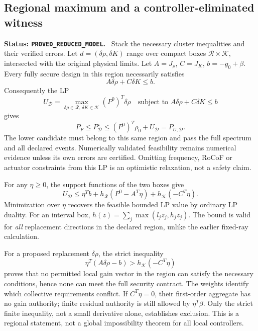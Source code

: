 \documentclass[11pt]{article}
\newcommand{\status}[1]{\par\smallskip\noindent\textbf{Status: \texttt{#1}.}\ }
\begin{document}
\subsection{Regional maximum and a controller-eliminated witness}
\status{PROVED\_REDUCED\_MODEL}
Stack the necessary cluster inequalities and their verified errors.
Let $d=(\delta\rho,\delta K)$ range over compact boxes
$\mathcal R\times\mathcal K$, intersected with the original physical
limits. Let $A=J_\rho$, $C=J_K$, $b=-g_0+\beta$.
Every fully secure design in this region necessarily satisfies
\[
 A\delta\rho+C\delta K\le b.
\]
Consequently the LP
\begin{equation}
 U_{\mathcal D}=\max_{\delta\rho\in\mathcal R,\,
                         \delta K\in\mathcal K}
 (P^0)^T\delta\rho\quad
 \text{subject to }A\delta\rho+C\delta K\le b \label{eq:regionalLP}
\end{equation}
gives
\begin{equation}
 \boxed{P_F\le P^\star_{\mathcal D}
 \le (P^0)^T\rho_0+U_{\mathcal D}=P_{U,\mathcal D}.}
 \label{eq:regional-bracket}
\end{equation}
The lower candidate must belong to this same region and pass the full
spectrum and all declared events. Numerically validated feasibility
remains numerical evidence unless its own errors are certified.
Omitting frequency, RoCoF or actuator constraints from this LP is an
optimistic relaxation, not a safety claim.

For any $\eta\ge0$, the support functions of the two boxes give
\begin{equation}
 U_{\mathcal D}\le
 \eta^Tb+h_{\mathcal R}(P^0-A^T\eta)
          +h_{\mathcal K}(-C^T\eta). \label{eq:regionaldual}
\end{equation}
Minimization over $\eta$ recovers the feasible bounded LP value
by ordinary LP duality. For an interval box,
$h(z)=\sum_j\max(l_jz_j,h_jz_j)$.
The bound is valid for \emph{all} replacement directions in the
declared region, unlike the earlier fixed-ray calculation.

For a proposed replacement $\delta\rho$, the strict inequality
\begin{equation}
 \eta^T(A\delta\rho-b)>h_{\mathcal K}(-C^T\eta)
 \label{eq:regional-exclusion}
\end{equation}
proves that no permitted local gain vector in the region can satisfy
the necessary conditions, hence none can meet the full security contract.
The weights identify which collective requirements conflict.
If $C^T\eta=0$, their first-order aggregate has no gain authority;
finite residual authority is still allowed by $\eta^T\beta$.
Only the strict finite inequality, not a small derivative alone,
establishes exclusion. This is a regional statement, not a global
impossibility theorem for all local controllers.
\end{document}
